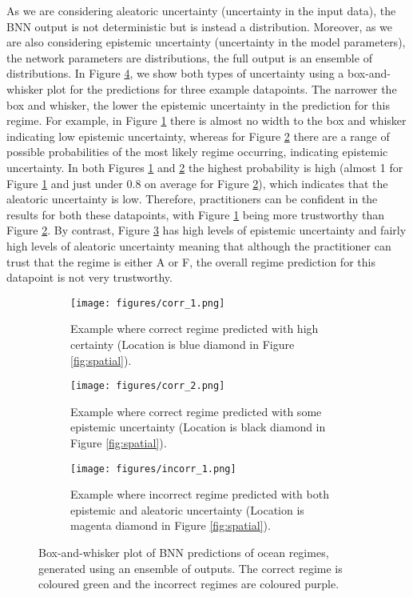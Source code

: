 \documentclass[a4paper]{article}
\begin{document}
As we are considering aleatoric uncertainty (uncertainty in the input data), the BNN output is not deterministic but is instead a distribution. Moreover, as we are also considering epistemic uncertainty (uncertainty in the model parameters), the network parameters are distributions, the full output is an ensemble of distributions. In Figure \ref{bin_examples}, we show both types of uncertainty using a box-and-whisker plot for the predictions for three example datapoints. The narrower the box and whisker, the lower the epistemic uncertainty in the prediction for this regime. For example, in Figure \ref{fig:corr_certain} there is almost no  width to the box and whisker indicating low epistemic uncertainty, whereas for Figure \ref{fig:corr_less_certain} there are a range of possible probabilities of the most likely regime occurring, indicating epistemic uncertainty. In both Figures \ref{fig:corr_certain} and \ref{fig:corr_less_certain} the highest probability is high (almost 1 for Figure \ref{fig:corr_certain} and just under 0.8 on average for Figure \ref{fig:corr_less_certain}), which indicates that the aleatoric uncertainty is low. Therefore, practitioners can be confident in the results for both these datapoints, with Figure \ref{fig:corr_certain} being more trustworthy than Figure \ref{fig:corr_less_certain}. By contrast, Figure \ref{fig:incorr} has high levels of epistemic uncertainty and fairly high levels of aleatoric uncertainty meaning that although the practitioner can trust that the regime is either A or F, the overall regime prediction for this datapoint is not very trustworthy.

\begin{figure}
\centering 
\begin{subfigure}{0.47\textwidth}
    \centering
    \texttt{[image: figures/corr\_1.png]}
    \caption{Example where correct regime predicted with high certainty (Location is blue diamond in Figure \ref{fig:spatial}).}
    \label{fig:corr_certain}
    \end{subfigure}
    \hfill
    \begin{subfigure}{0.47\textwidth}
    \centering
    \texttt{[image: figures/corr\_2.png]}
    \caption{Example where correct regime predicted with some epistemic uncertainty (Location is black diamond in Figure \ref{fig:spatial}).}
    \label{fig:corr_less_certain}
    \end{subfigure}
    \begin{subfigure}{0.47\textwidth}
    \centering
    \texttt{[image: figures/incorr\_1.png]}
    \caption{Example where incorrect regime predicted with both epistemic and aleatoric uncertainty (Location is magenta diamond in Figure \ref{fig:spatial}).}
    \label{fig:incorr}
    \end{subfigure}
    \caption{Box-and-whisker plot of BNN predictions of ocean regimes, generated using an ensemble of outputs. The correct regime is coloured green and the incorrect regimes are coloured purple.}\label{bin_examples}
\end{figure}
\end{document}
